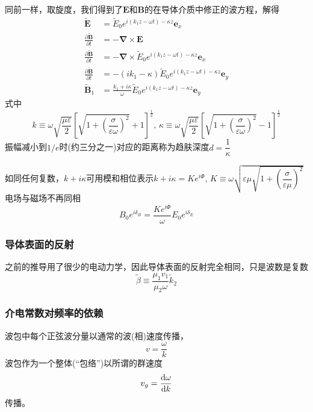 同前一样，取旋度，我们得到了$\boldsymbol E$和$\boldsymbol B$的在导体介质中修正的波方程，解得
\begin{align}
    \widetilde{\boldsymbol{E}}&= \widetilde{E}_{0}e^{i(k_1 z-\omega t)-\kappa z}\boldsymbol{e}_x\\
    \frac{\partial\widetilde{\boldsymbol{B}}}{\partial t}&=-\boldsymbol{\nabla}\times\boldsymbol{E}\\
    \frac{\partial\widetilde{\boldsymbol{B}}}{\partial t}&=-\boldsymbol{\nabla}\times\widetilde{E}_{0}e^{i(k_1 z-\omega t)-\kappa z}\boldsymbol{e}_x\\
    \frac{\partial\widetilde{\boldsymbol{B}}}{\partial t}&=-(ik_1-\kappa)\widetilde{E}_{0}e^{i(k_1 z-\omega t)-\kappa z}\boldsymbol{e}_y\\
\widetilde{\boldsymbol{B}}_1&=\frac{k_1+i\kappa}{\omega}\widetilde{E}_{0}e^{i(k_1 z-\omega t)-\kappa z}\boldsymbol{e}_y
\end{align}
式中
\begin{equation}
    k\equiv\omega\sqrt{\frac{\mu\varepsilon}{2}}\left[\sqrt{1+\left(\frac{\sigma}{\varepsilon\omega}\right)^2}+1\right]^\frac{1}{2},\, \kappa\equiv\omega\sqrt{\frac{\mu\varepsilon}{2}}\left[\sqrt{1+\left(\frac{\sigma}{\varepsilon\omega}\right)^2}-1\right]^\frac{1}{2}
\end{equation}
振幅减小到$1/e$时(约三分之一)对应的距离称为趋肤深度$d=\dfrac{1}{\kappa}$

如同任何复数，$k+i\kappa$可用模和相位表示$k+i\kappa=Ke^{i\Phi},\, K\equiv \omega\sqrt{\varepsilon\mu\sqrt{1+\left(\dfrac{\sigma}{\varepsilon\mu}\right)^2}}$
电场与磁场不再同相
\begin{equation}
    B_0e^{i\delta_B}=\frac{Ke^{i\Phi}}{\omega}E_0e^{i\delta_E}
\end{equation}

\subsubsection{导体表面的反射}
之前的推导用了很少的电动力学，因此导体表面的反射完全相同，只是波数是复数
\begin{equation}
    \widetilde{\beta}\equiv\frac{\mu_1v_1}{\mu_2\omega}\widetilde{k}_2
\end{equation}

\subsubsection{介电常数对频率的依赖}

波包中每个正弦波分量以通常的波(相)速度传播，
\begin{equation}
    v=\frac{\omega}{k}
\end{equation}
波包作为一个整体(“包络”)以所谓的群速度
\begin{equation}
    v_g=\frac{\dif\omega}{\dif k}
\end{equation}
传播。

